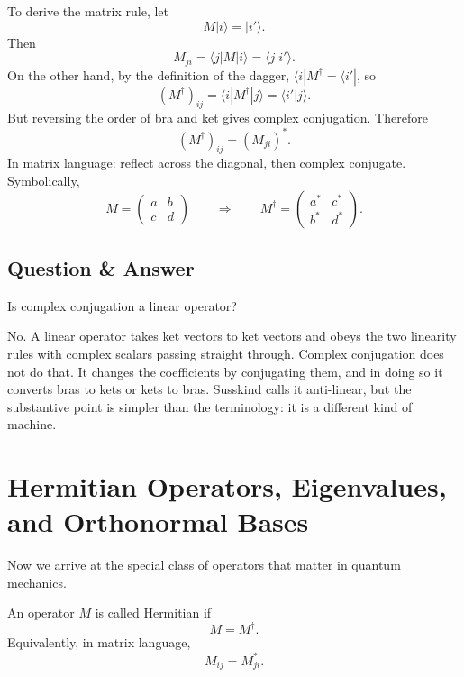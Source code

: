 To derive the matrix rule, let
\begin{equation}
M|i\rangle=|i'\rangle.
\end{equation}
Then
\begin{equation}
M_{ji}=\langle j|M|i\rangle=\langle j|i'\rangle.
\end{equation}
On the other hand, by the definition of the dagger, \(\langle i|M^\dagger=\langle i'|\), so
\begin{equation}
(M^\dagger)_{ij}=\langle i|M^\dagger|j\rangle=\langle i'|j\rangle.
\end{equation}
But reversing the order of bra and ket gives complex conjugation. Therefore
\begin{equation}
(M^\dagger)_{ij}=(M_{ji})^*.
\end{equation}
In matrix language: reflect across the diagonal, then complex conjugate. Symbolically,
\begin{equation}
M=
\begin{pmatrix}
a & b \\
c & d
\end{pmatrix}
\qquad \Longrightarrow \qquad
M^\dagger=
\begin{pmatrix}
a^* & c^* \\
b^* & d^*
\end{pmatrix}.
\end{equation}

\subsection{Question \& Answer}

Is complex conjugation a linear operator?

No. A linear operator takes ket vectors to ket vectors and obeys the two linearity rules with complex scalars passing straight through. Complex conjugation does not do that. It changes the coefficients by conjugating them, and in doing so it converts bras to kets or kets to bras. Susskind calls it anti-linear, but the substantive point is simpler than the terminology: it is a different kind of machine.

\section{Hermitian Operators, Eigenvalues, and Orthonormal Bases}

Now we arrive at the special class of operators that matter in quantum mechanics.

\begin{definition}
An operator \(M\) is called Hermitian if
\begin{equation}
M=M^\dagger.
\end{equation}
Equivalently, in matrix language,
\begin{equation}
M_{ij}=M_{ji}^*.
\end{equation}
\end{definition}

